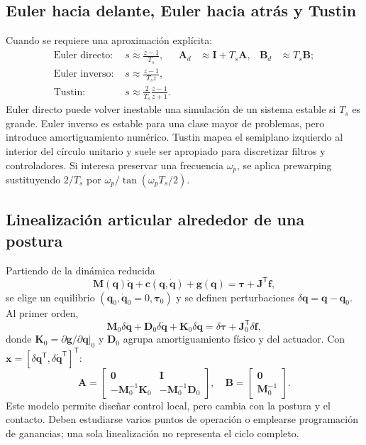 \documentclass[11pt,letterpaper]{article}
\newcommand{\vect}[1]{\bm{#1}}
\newcommand{\mat}[1]{\bm{#1}}
\newcommand{\trans}{^{\mathsf T}}
\begin{document}
\subsection{Euler hacia delante, Euler hacia atrás y Tustin}
Cuando se requiere una aproximación explícita:
\begin{align}
 \text{Euler directo: }&s\approx\frac{z-1}{T_s},&
 \mat A_d&\approx\mat I+T_s\mat A,&\mat B_d&\approx T_s\mat B;\\
 \text{Euler inverso: }&s\approx\frac{z-1}{T_sz},\\
 \text{Tustin: }&s\approx\frac{2}{T_s}\frac{z-1}{z+1}.
\end{align}
Euler directo puede volver inestable una simulación de un sistema estable si
$T_s$ es grande. Euler inverso es estable para una clase mayor de problemas,
pero introduce amortiguamiento numérico. Tustin mapea el semiplano izquierdo al
interior del círculo unitario y suele ser apropiado para discretizar filtros y
controladores. Si interesa preservar una frecuencia $\omega_p$, se aplica
prewarping sustituyendo $2/T_s$ por $\omega_p/\tan(\omega_pT_s/2)$.

\subsection{Linealización articular alrededor de una postura}
Partiendo de la dinámica reducida
\begin{equation}
 \mat M(\vect q)\ddot{\vect q}+\vect c(\vect q,\dot{\vect q})
 +\vect g(\vect q)=\vect\tau+\mat J\trans\vect f,
\end{equation}
se elige un equilibrio $(\vect q_0,\dot{\vect q}_0=0,\vect\tau_0)$ y se
definen perturbaciones $\delta\vect q=\vect q-\vect q_0$. Al primer orden,
\begin{equation}
 \mat M_0\delta\ddot{\vect q}+\mat D_0\delta\dot{\vect q}
 +\mat K_0\delta\vect q=\delta\vect\tau+\mat J_0\trans\delta\vect f,
 \label{eq:linearjoint}
\end{equation}
donde $\mat K_0=\partial\vect g/\partial\vect q|_0$ y $\mat D_0$ agrupa
amortiguamiento físico y del actuador. Con
$\vect x=[\delta\vect q\trans,\delta\dot{\vect q}\trans]\trans$:
\begin{equation}
 \mat A=\begin{bmatrix}\mat 0&\mat I\\-\mat M_0^{-1}\mat K_0&
 -\mat M_0^{-1}\mat D_0\end{bmatrix},\quad
 \mat B=\begin{bmatrix}\mat 0\\\mat M_0^{-1}\end{bmatrix}.
 \label{eq:jointss}
\end{equation}
Este modelo permite diseñar control local, pero cambia con la postura y el
contacto. Deben estudiarse varios puntos de operación o emplearse programación
de ganancias; una sola linealización no representa el ciclo completo.
\end{document}
